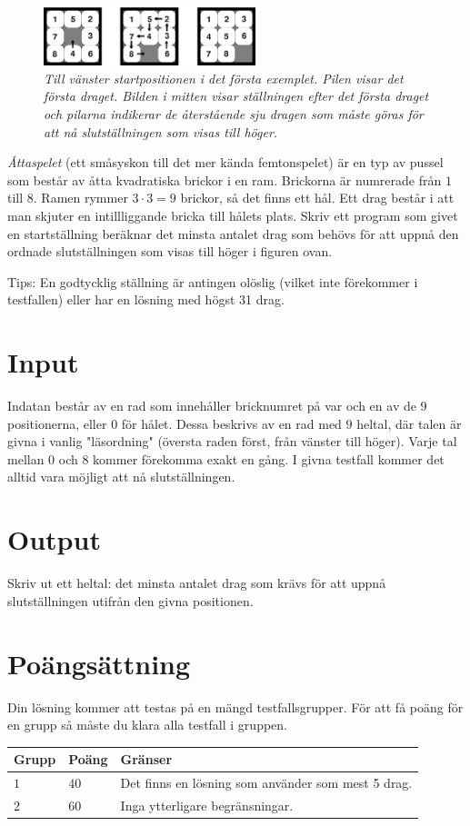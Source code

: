 
\begin{figure}[!h]
	\centering
	\includegraphics[width=0.55\textwidth]{figur}
	\caption{\emph{Till vänster startpositionen i det första exemplet. Pilen visar det första draget. Bilden i mitten visar ställningen efter det första draget och pilarna indikerar de återstående sju dragen som måste göras för att nå slutställningen som visas till höger.}}
\end{figure}


\emph{Åttaspelet} (ett småsyskon till det mer kända femtonspelet) är en typ av pussel som består av åtta kvadratiska brickor i en ram. Brickorna är numrerade från $1$ till $8$. Ramen rymmer $3\cdot3=9$ brickor, så det finns ett hål. Ett drag består i att man skjuter en intillliggande bricka till hålets plats. Skriv ett program som givet en startställning beräknar det minsta antalet drag som behövs för att uppnå den ordnade slutställningen som visas till höger i figuren ovan.

Tips: En godtycklig ställning är antingen olöslig (vilket inte förekommer i testfallen) eller har en lösning med högst 31 drag.

\section*{Input}
Indatan består av en rad som innehåller bricknumret på var och en av de $9$ positionerna, eller $0$ för hålet.
Dessa beskrivs av en rad med $9$ heltal, där talen är givna i vanlig "läsordning" (översta raden först, från vänster till höger).
Varje tal mellan $0$ och $8$ kommer förekomma exakt en gång. I givna testfall kommer det alltid vara möjligt att nå slutställningen.

\section*{Output}
Skriv ut ett heltal: det minsta antalet drag som krävs för att uppnå slutställningen utifrån den givna positionen.

\section*{Poängsättning}
Din lösning kommer att testas på en mängd testfallsgrupper.
För att få poäng för en grupp så måste du klara alla testfall i gruppen.

\noindent
\begin{tabular}{| l | l | p{12cm} |}
  \hline
  \textbf{Grupp} & \textbf{Poäng} & \textbf{Gränser} \\ \hline
  $1$    & $40$          & Det finns en lösning som använder som mest 5 drag.  \\ \hline
  $2$    & $60$          & Inga ytterligare begränsningar.  \\ \hline
\end{tabular}
